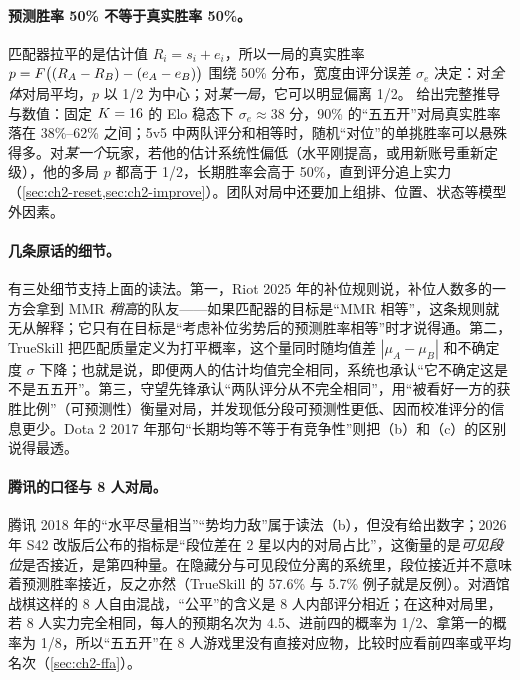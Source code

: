 \paragraph{预测胜率 50\% 不等于真实胜率 50\%。}
匹配器拉平的是估计值 $R_i=s_i+e_i$，所以一局的真实胜率 $p=F\big((R_A-R_B)-(e_A-e_B)\big)$ 围绕 50\% 分布，宽度由评分误差 $\sigma_e$ 决定：对\emph{全体}对局平均，$p$ 以 1/2 为中心；对\emph{某一局}，它可以明显偏离 1/2。 给出完整推导与数值：固定 $K=16$ 的 Elo 稳态下 $\sigma_e\approx38$ 分，90\% 的“五五开”对局真实胜率落在 38\%–62\% 之间；5v5 中两队评分和相等时，随机“对位”的单挑胜率可以悬殊得多\tagOwn。对\emph{某一个}玩家，若他的估计系统性偏低（水平刚提高，或用新账号重新定级），他的多局 $p$ 都高于 1/2，长期胜率会高于 50\%，直到评分追上实力（\cref{sec:ch2-reset,sec:ch2-improve}）。团队对局中还要加上组排、位置、状态等模型外因素。

\paragraph{几条原话的细节。}
有三处细节支持上面的读法。第一，Riot 2025 年的补位规则说，补位人数多的一方会拿到 MMR \emph{稍高}的队友\cite{riot2025ranked}——如果匹配器的目标是“MMR 相等”，这条规则就无从解释；它只有在目标是“考虑补位劣势后的预测胜率相等”时才说得通。第二，TrueSkill 把匹配质量定义为打平概率，这个量同时随均值差 $|\mu_A-\mu_B|$ 和不确定度 $\sigma$ 下降\cite{microsoft2005trueskill}；也就是说，即便两人的估计均值完全相同，系统也承认“它不确定这是不是五五开”。第三，守望先锋承认“两队评分从不完全相同”，用“被看好一方的获胜比例”（可预测性）衡量对局，并发现低分段可预测性更低、因而校准评分的信息更少\cite{blizzard2023overwatch}。Dota 2 2017 年那句“长期均等不等于有竞争性”则把（b）和（c）的区别说得最透\cite{valve2017matchmaking}。

\paragraph{腾讯的口径与 8 人对局。}
腾讯 2018 年的“水平尽量相当”“势均力敌”属于读法（b），但没有给出数字；2026 年 S42 改版后公布的指标是“段位差在 2 星以内的对局占比”，这衡量的是\emph{可见段位}是否接近，是第四种量。在隐藏分与可见段位分离的系统里，段位接近并不意味着预测胜率接近，反之亦然（TrueSkill 的 57.6\% 与 5.7\% 例子就是反例）。对酒馆战棋这样的 8 人自由混战，“公平”的含义是 8 人内部评分相近；在这种对局里，若 8 人实力完全相同，每人的预期名次为 4.5、进前四的概率为 1/2、拿第一的概率为 1/8\tagOwn，所以“五五开”在 8 人游戏里没有直接对应物，比较时应看前四率或平均名次（\cref{sec:ch2-ffa}）。

